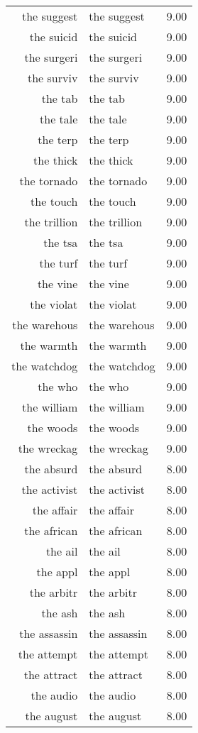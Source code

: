 \begin{table}[ht]
\begin{tabular}{rlr}
  the suggest & the suggest & 9.00 \\ 
  the suicid & the suicid & 9.00 \\ 
  the surgeri & the surgeri & 9.00 \\ 
  the surviv & the surviv & 9.00 \\ 
  the tab & the tab & 9.00 \\ 
  the tale & the tale & 9.00 \\ 
  the terp & the terp & 9.00 \\ 
  the thick & the thick & 9.00 \\ 
  the tornado & the tornado & 9.00 \\ 
  the touch & the touch & 9.00 \\ 
  the trillion & the trillion & 9.00 \\ 
  the tsa & the tsa & 9.00 \\ 
  the turf & the turf & 9.00 \\ 
  the vine & the vine & 9.00 \\ 
  the violat & the violat & 9.00 \\ 
  the warehous & the warehous & 9.00 \\ 
  the warmth & the warmth & 9.00 \\ 
  the watchdog & the watchdog & 9.00 \\ 
  the who & the who & 9.00 \\ 
  the william & the william & 9.00 \\ 
  the woods & the woods & 9.00 \\ 
  the wreckag & the wreckag & 9.00 \\ 
  the absurd & the absurd & 8.00 \\ 
  the activist & the activist & 8.00 \\ 
  the affair & the affair & 8.00 \\ 
  the african & the african & 8.00 \\ 
  the ail & the ail & 8.00 \\ 
  the appl & the appl & 8.00 \\ 
  the arbitr & the arbitr & 8.00 \\ 
  the ash & the ash & 8.00 \\ 
  the assassin & the assassin & 8.00 \\ 
  the attempt & the attempt & 8.00 \\ 
  the attract & the attract & 8.00 \\ 
  the audio & the audio & 8.00 \\ 
  the august & the august & 8.00 \\ 

\end{tabular}
\end{table}
